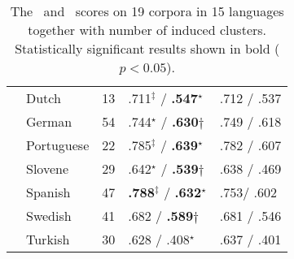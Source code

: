 \begin{table}[t]
\begin{tabular}{l|l|l|l|l|}
    & Dutch       & 13   & .711$^\ddagger$ / {\bf .547}$^\star$       & .712 / .537\\
    & German      & 54   & .744$^\star$ / {\bf .630}$\dagger$         & .749 / .618\\
    & Portuguese  & 22   & .785$^\ddagger$ / {\bf .639}$^\star$       & .782 / .607\\
    & Slovene     & 29   & .642$^\star$ / {\bf.539}$\dagger$          & .638 / .469\\
    & Spanish     & 47   & {\bf.788}$^\ddagger$ / {\bf .632}$^\star$  & .753/ .602\\
    & Swedish     & 41   & .682 / {\bf.589}$\dagger$                  & .681 / .546\\
    & Turkish     & 30   & .628 / .408$^\star$                        & .637 / .401\\ 
    \hline
  \end{tabular}
  \caption{The \mto\ and \vm\ scores on 19 corpora in 15 languages together
  with number of induced clusters.  Statistically significant results shown
  in bold ($p < 0.05$).
}  
  \label{tab:multiresults}
\end{table}
